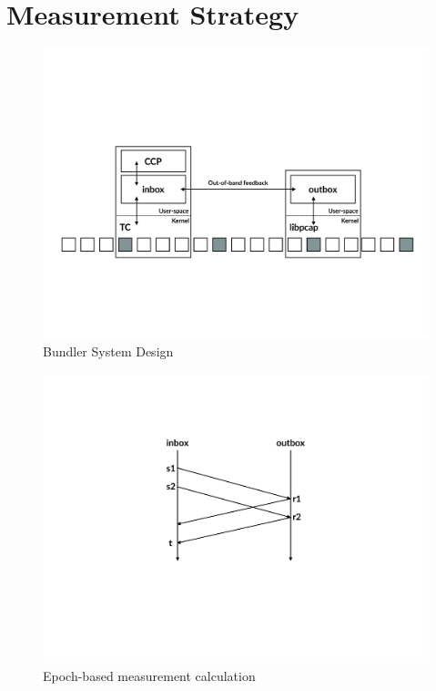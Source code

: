 \section{Measurement Strategy}\label{s:measurement}
\begin{figure}
    \centering
    \includegraphics[width=2\columnwidth]{img/bundler-diagram}
    \caption{Bundler System Design}\label{fig:bundler}
\end{figure}
\begin{figure}
    \centering
    \includegraphics[width=\columnwidth]{img/rate-calculation}
    \caption{Epoch-based measurement calculation}\label{fig:ratecalc}
\end{figure}


